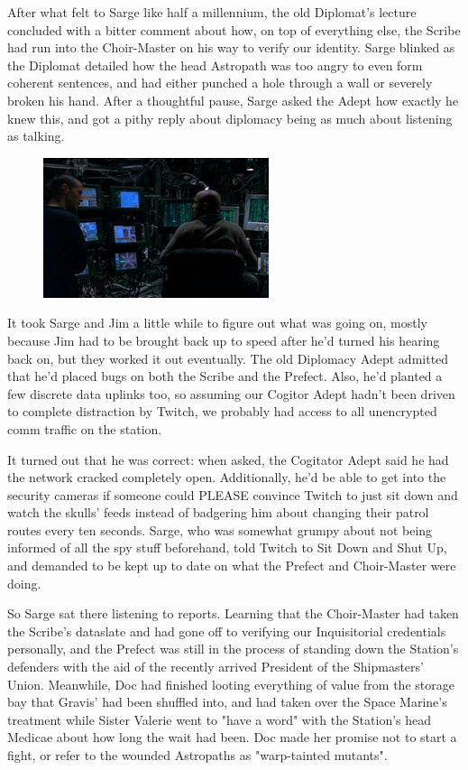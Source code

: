 After what felt to Sarge like half a millennium, the old Diplomat's lecture concluded with a bitter comment about how, on top of everything else, the Scribe had run into the Choir-Master on his way to verify our identity. 
Sarge blinked as the Diplomat detailed how the head Astropath was too angry to even form coherent sentences, and had either punched a hole through a wall or severely broken his hand. 
After a thoughtful pause, Sarge asked the Adept how exactly he knew this, and got a pithy reply about diplomacy being as much about listening as talking.

\begin{figure}
	\begin{center}
		\includegraphics[width=\figwidth]{pics/14/15.png}
	\end{center}
\end{figure}
It took Sarge and Jim a little while to figure out what was going on, mostly because Jim had to be brought back up to speed after he'd turned his hearing back on, but they worked it out eventually. 
The old Diplomacy Adept admitted that he'd placed bugs on both the Scribe and the Prefect. 
Also, he'd planted a few discrete data uplinks too, so assuming our Cogitor Adept hadn't been driven to complete distraction by Twitch, we probably had access to all unencrypted comm traffic on the station.

It turned out that he was correct: 
when asked, the Cogitator Adept said he had the network cracked completely open. 
Additionally, he'd be able to get into the security cameras if someone could PLEASE convince Twitch to just sit down and watch the skulls' feeds instead of badgering him about changing their patrol routes every ten seconds. 
Sarge, who was somewhat grumpy about not being informed of all the spy stuff beforehand, told Twitch to Sit Down and Shut Up, and demanded to be kept up to date on what the Prefect and Choir-Master were doing.

So Sarge sat there listening to reports. 
Learning that the Choir-Master had taken the Scribe's dataslate and had gone off to verifying our Inquisitorial credentials personally, and the Prefect was still in the process of standing down the Station's defenders with the aid of the recently arrived President of the Shipmasters' Union. 
Meanwhile, Doc had finished looting everything of value from the storage bay that Gravis' had been shuffled into, and had taken over the Space Marine's treatment while Sister Valerie went to "have a word" with the Station's head Medicae about how long the wait had been. 
Doc made her promise not to start a fight, or refer to the wounded Astropaths as "warp-tainted mutants".

